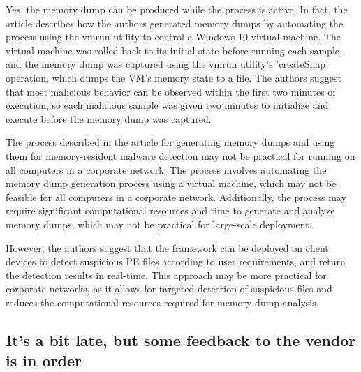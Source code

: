 \documentclass{article}
\begin{document}
Yes, the memory dump can be produced while the process is active. In fact, the article describes how the authors generated memory dumps by automating the process using the vmrun utility to control a Windows 10 virtual machine. The virtual machine was rolled back to its initial state before running each sample, and the memory dump was captured using the vmrun utility's 'createSnap' operation, which dumps the VM's memory state to a file. The authors suggest that most malicious behavior can be observed within the first two minutes of execution, so each malicious sample was given two minutes to initialize and execute before the memory dump was captured.

The process described in the article for generating memory dumps and using them for memory-resident malware detection may not be practical for running on all computers in a corporate network. The process involves automating the memory dump generation process using a virtual machine, which may not be feasible for all computers in a corporate network. Additionally, the process may require significant computational resources and time to generate and analyze memory dumps, which may not be practical for large-scale deployment. 

However, the authors suggest that the framework can be deployed on client devices to detect suspicious PE files according to user requirements, and return the detection results in real-time. This approach may be more practical for corporate networks, as it allows for targeted detection of suspicious files and reduces the computational resources required for memory dump analysis.

\subsection{It's a bit late, but some feedback to the vendor is in order}
\end{document}
